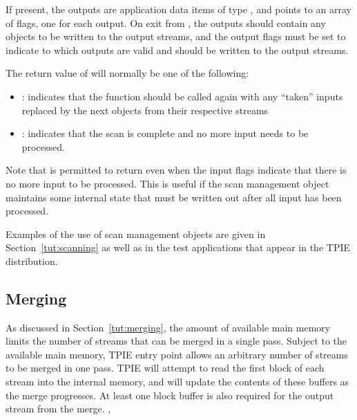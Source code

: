\begin{itemize}
    If present, the outputs  are
    application data items of type , and
     points to an array of flags, one for each
    output. On exit from , the outputs
    should contain any objects to be written to the output
    streams, and the output flags must be set to indicate to
     which outputs are valid and should
    be written to the output streams.
    
    The return value of  will normally be
    one of the following:
    \begin{itemize}
        \item {}:
         indicates that
        the function should be called again with any
        ``taken'' inputs replaced by the next objects from
        their respective streams
        \item {}: indicates that the
        scan is complete and no more input needs to be
        processed.
    \end{itemize}
    
    Note that  is permitted to return
     even when the input flags
    indicate that there is no more input to be processed.
    This is useful if the scan management object maintains
    some internal state that must be written out after all
    input has been processed.  

\end{itemize}

Examples of the use of scan management objects are given in
Section~\ref{tut:scanning} as well as in the test applications that
appear in the TPIE distribution.



\subsection{Merging}

As discussed in Section~\ref{tut:merging}, the amount of
available main memory limits the number of streams that can
be merged in a single pass. Subject to the available main
memory, TPIE entry point 
allows an arbitrary number of streams to be merged in one
pass. TPIE will attempt to read the first block of each
stream into the internal memory, and will update the
contents of these buffers as the merge progresses. At least
one block buffer is also required for the output stream from
the merge.  ,

